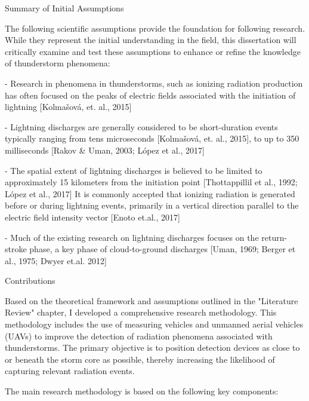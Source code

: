 \secc Summary of Initial Assumptions

The following scientific assumptions provide the foundation for following research. While they represent the initial understanding in the field, this dissertation will critically examine and test these assumptions to enhance or refine the knowledge of thunderstorm phenomena:

\begitems
\item - Research in phenomena in thunderstorms, such as ionizing radiation production has often focused on the peaks of electric fields associated with the initiation of lightning [Kolmašová, et. al., 2015]
\item - Lightning discharges are generally considered to be short-duration events  typically ranging from tens microseconds [Kolmašová, et. al., 2015], to up to 350 milliseconds [Rakov & Uman, 2003; López et al., 2017]
\item - The spatial extent of lightning discharges is believed to be limited to approximately 15 kilometers from the initiation point [Thottappillil et al., 1992; López et al., 2017]
It is commonly accepted that ionizing radiation is generated before or during lightning events, primarily in a vertical direction parallel to the electric field intensity vector  [Enoto et.al., 2017]
\item - Much of the existing research on lightning discharges focuses on the return-stroke phase, a key phase of cloud-to-ground discharges [Uman, 1969; Berger et al., 1975; Dwyer et.al. 2012]
\enditems

\sec Contributions

Based on the theoretical framework and assumptions outlined in the "Literature Review" chapter, I developed a comprehensive research methodology. This methodology includes the use of measuring vehicles and unmanned aerial vehicles (UAVs) to improve the detection of radiation phenomena associated with thunderstorms. The primary objective is to position detection devices as close to or beneath the storm core as possible, thereby increasing the likelihood of capturing relevant radiation events.

The main research methodology is based on the following key components:

